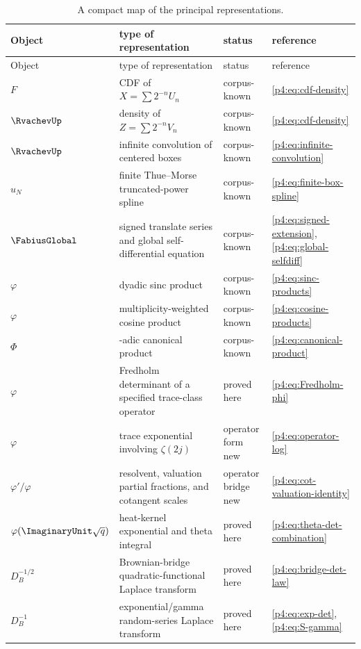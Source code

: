 \documentclass[11pt]{article}
\theoremstyle{definition}
\theoremstyle{remark}
\newcommand{\PhiF}{\Phi}
\newcommand{\phiF}{\varphi}
\begin{document}
\small
\begin{longtable}{@{}>{\raggedright\arraybackslash}p{}
                  >{\raggedright\arraybackslash}p{}
                  >{\raggedright\arraybackslash}p{}
                  >{\raggedright\arraybackslash}p{}@{}}
\caption{A compact map of the principal representations.}\label{p4:tab:master-atlas}\\
\toprule
Object&type of representation&status&reference\\
\midrule
\endfirsthead
\toprule
Object&type of representation&status&reference\\
\midrule
\endhead
\bottomrule
\endfoot
\(F\)&CDF of \(X=\sum2^{-n}U_n\)&corpus-known&\eqref{p4:eq:cdf-density}\\
\(\RvachevUp\)&density of \(Z=\sum2^{-n}V_n\)&corpus-known&\eqref{p4:eq:cdf-density}\\
\(\RvachevUp\)&infinite convolution of centered boxes&corpus-known&\eqref{p4:eq:infinite-convolution}\\
\(u_N\)&finite Thue--Morse truncated-power spline&corpus-known&\eqref{p4:eq:finite-box-spline}\\
\(\FabiusGlobal\)&signed translate series and global self-differential equation&corpus-known&\eqref{p4:eq:signed-extension}, \eqref{p4:eq:global-selfdiff}\\
\(\phiF\)&dyadic sinc product&corpus-known&\eqref{p4:eq:sinc-products}\\
\(\phiF\)&multiplicity-weighted cosine product&corpus-known&\eqref{p4:eq:cosine-products}\\
\(\PhiF\)&2-adic canonical product&corpus-known&\eqref{p4:eq:canonical-product}\\
\(\phiF\)&Fredholm determinant of a specified trace-class operator&proved here&\eqref{p4:eq:Fredholm-phi}\\
\(\phiF\)&trace exponential involving \(\zeta(2j)\)&operator form new&\eqref{p4:eq:operator-log}\\
\(\phiF'/\phiF\)&resolvent, valuation partial fractions, and cotangent scales&operator bridge new&\eqref{p4:eq:cot-valuation-identity}\\
\(\phiF(\ImaginaryUnit\sqrt q)\)&heat-kernel exponential and theta integral&proved here&\eqref{p4:eq:theta-det-combination}\\
\(D_B^{-1/2}\)&Brownian-bridge quadratic-functional Laplace transform&proved here&\eqref{p4:eq:bridge-det-law}\\
\(D_B^{-1}\)&exponential/gamma random-series Laplace transform&proved here&\eqref{p4:eq:exp-det}, \eqref{p4:eq:S-gamma}\\

\end{longtable}
\end{document}
